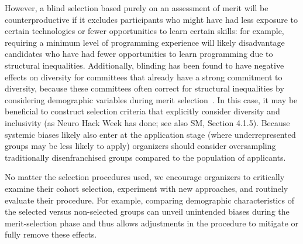 However, a blind selection based purely on an assessment of merit will be counterproductive if it excludes participants who might have had less exposure to certain technologies or fewer opportunities to learn certain skills: for example, requiring a minimum level of programming experience will likely disadvantage candidates who have had fewer opportunities to learn programming due to structural inequalities.
Additionally, blinding has been found to have negative effects on diversity for committees that  already have a strong commitment to diversity, because these committees often correct for structural inequalities by considering demographic variables during merit selection~\cite{behaghel2015unintended}.
In this case, it may be beneficial to construct selection criteria that explicitly consider diversity and inclusivity (as Neuro Hack Week has done; see also SM, Section 4.1.5).
Because systemic biases likely also enter at the application stage (where underrepresented groups may be less likely to apply) organizers should consider oversampling traditionally disenfranchised groups compared to the population of applicants.

No matter the selection procedures used, we encourage organizers to critically examine their cohort selection, experiment with new approaches, and routinely evaluate their procedure. For example, comparing demographic characteristics of the selected versus non-selected groups can unveil unintended biases during the merit-selection phase and thus allows adjustments in the procedure to mitigate or fully remove these effects.
